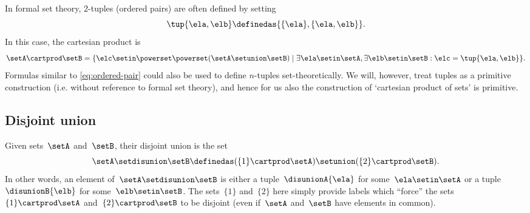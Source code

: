 \begin{remark}
    In formal set theory, 2-tuples (ordered pairs) are often defined by setting
    \begin{equation}
        \label{eq:ordered-pair}
        \tup{\ela, \elb} \definedas \{ \{\ela \} , \{ \ela, \elb \} \}.
    \end{equation}
    In this case, the cartesian product is
    \begin{equation}
        \setA \cartprod \setB = \{ \elc \setin\powerset \powerset (\setA \setunion \setB) \mid \exists \ela \setin\setA, \exists \elb \setin\setB : \elc = \tup{\ela, \elb} \}.
    \end{equation}
    Formulas similar to \cref{eq:ordered-pair} could also be used to define $n$-tuples set-theoretically.
    We will, however, treat tuples as a primitive construction (i.e. without reference to formal set theory), and hence for us also the construction of `cartesian product of sets' is primitive.
\end{remark}

\subsection{Disjoint union}
\label{sec:disjoint-union}

Given sets~$\setA$ and~$\setB$, their disjoint union is the set
\begin{equation*}
    \setA \setdisunion \setB \definedas (  \{ 1 \} \cartprod \setA) \setunion ( \{2\}  \cartprod \setB).
\end{equation*}
In other words, an element of~$\setA \setdisunion \setB$ is either a tuple~$\disunionA{\ela}$ for some~$\ela \setin\setA$ or a tuple $\disunionB{\elb}$ for some~$\elb \setin\setB$.
The sets~$\{ 1 \}$ and~$\{2\}$ here simply provide labels which ``force'' the sets~$\{ 1 \}  \cartprod \setA$ and~$ \{2\}  \cartprod \setB$ to be disjoint (even if~$\setA$ and~$\setB$ have elements in common).



